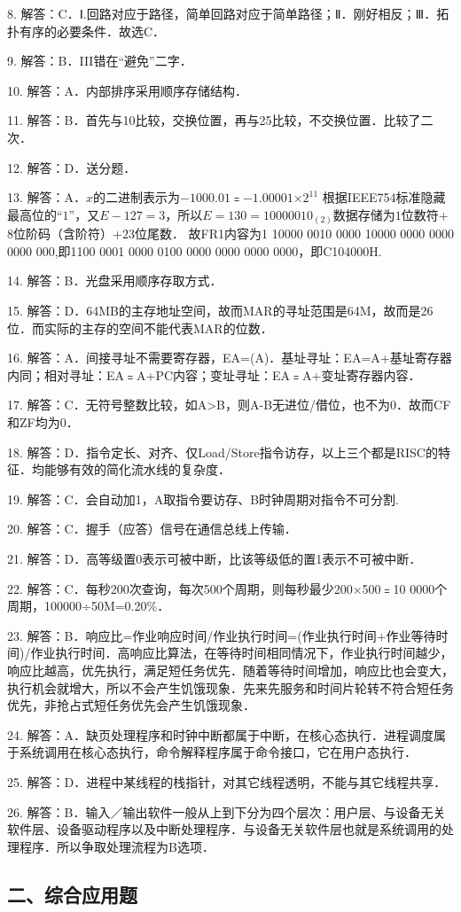8. 解答：C．Ⅰ.回路对应于路径，简单回路对应于简单路径；Ⅱ．刚好相反；Ⅲ．拓扑有序的必要条件．故选C．

9. 解答：B．III错在“避免”二字．

10. 解答：A．内部排序采用顺序存储结构．

11. 解答：B．首先与10比较，交换位置，再与25比较，不交换位置．比较了二次．

12. 解答：D．送分题．

13. 解答：A．$x$的二进制表示为$-1000.01$﹦$-1.000 01$×$2^{11}$ 根据IEEE754标准隐藏最高位的“$1$”，又$E-127=3$，所以$E=130=1000 0010_{(2)}$数据存储为$1$位数符+$8$位阶码（含阶符）+$23$位尾数．
故FR1内容为1 10000 0010 0000 10000 0000 0000 0000 000,即1100 0001 0000 0100 0000 0000 0000 0000，即C104000H.

14. 解答：B．光盘采用顺序存取方式．

15. 解答：D．64MB的主存地址空间，故而MAR的寻址范围是64M，故而是26位．而实际的主存的空间不能代表MAR的位数．

16. 解答：A．间接寻址不需要寄存器，EA=(A)．基址寻址：EA=A+基址寄存器内同；相对寻址：EA﹦A+PC内容；变址寻址：EA﹦A+变址寄存器内容．

17. 解答：C．无符号整数比较，如A>B，则A-B无进位/借位，也不为0．故而CF和ZF均为0．

18. 解答：D．指令定长、对齐、仅Load/Store指令访存，以上三个都是RISC的特征．均能够有效的简化流水线的复杂度．

19. 解答：C．会自动加1，A取指令要访存、B时钟周期对指令不可分割.

20. 解答：C．握手（应答）信号在通信总线上传输．

21. 解答：D．高等级置0表示可被中断，比该等级低的置1表示不可被中断．

22. 解答：C．每秒200次查询，每次500个周期，则每秒最少200×500﹦10 0000个周期，100000÷50M=0.20\%．

23. 解答：B．响应比=作业响应时间/作业执行时间=(作业执行时间+作业等待时间)/作业执行时间．高响应比算法，在等待时间相同情况下，作业执行时间越少，响应比越高，优先执行，满足短任务优先．随着等待时间增加，响应比也会变大，执行机会就增大，所以不会产生饥饿现象．先来先服务和时间片轮转不符合短任务优先，非抢占式短任务优先会产生饥饿现象．

24. 解答：A．缺页处理程序和时钟中断都属于中断，在核心态执行．进程调度属于系统调用在核心态执行，命令解释程序属于命令接口，它在用户态执行．

25. 解答：D．进程中某线程的栈指针，对其它线程透明，不能与其它线程共享．

26. 解答：B．输入／输出软件一般从上到下分为四个层次：用户层、与设备无关软件层、设备驱动程序以及中断处理程序．与设备无关软件层也就是系统调用的处理程序．所以争取处理流程为B选项．


\subsection{二、综合应用题}